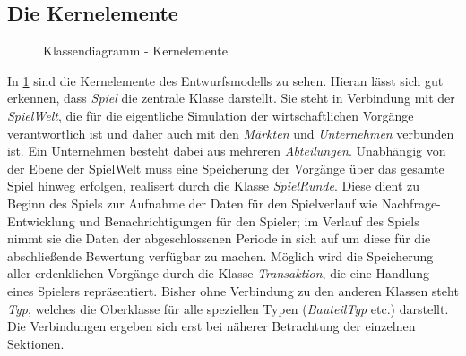\subsection{Die Kernelemente}
\begin{figure}[htb]
     \centering
     \caption{Klassendiagramm - Kernelemente}
     \label{img:fachkonzept-entwurf-kern}
\end{figure}

In \ref{img:fachkonzept-entwurf-kern} sind die Kernelemente des Entwurfsmodells zu sehen. Hieran lässt sich gut erkennen, dass \textit{Spiel} die zentrale Klasse darstellt. Sie steht in Verbindung mit der \textit{SpielWelt}, die für die eigentliche Simulation der wirtschaftlichen Vorgänge verantwortlich ist und daher auch mit den \textit{Märkten} und \textit{Unternehmen} verbunden ist. Ein Unternehmen besteht dabei aus mehreren \textit{Abteilungen}. Unabhängig von der Ebene der SpielWelt muss eine Speicherung der Vorgänge über das gesamte Spiel hinweg erfolgen, realisert durch die Klasse \textit{SpielRunde}. Diese dient zu Beginn des Spiels zur Aufnahme der Daten für den Spielverlauf wie Nachfrage-Entwicklung und Benachrichtigungen für den Spieler; im Verlauf des Spiels nimmt sie die Daten der abgeschlossenen Periode in sich auf um diese für die abschließende Bewertung verfügbar zu machen. Möglich wird die Speicherung aller erdenklichen Vorgänge durch die Klasse \textit{Transaktion}, die eine Handlung eines Spielers repräsentiert. Bisher ohne Verbindung zu den anderen Klassen steht \textit{Typ}, welches die Oberklasse für alle speziellen Typen (\textit{BauteilTyp} etc.) darstellt. Die Verbindungen ergeben sich erst bei näherer Betrachtung der einzelnen Sektionen.


